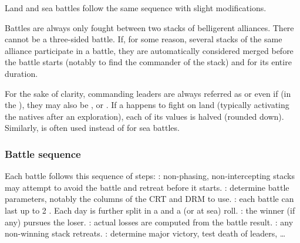 Land and sea battles follow the same sequence with slight modifications.

Battles are always only fought between two stacks of belligerent
alliances. There cannot be a three-sided battle. If, for some reason, several
stacks of the same alliance participate in a battle, they are automatically
considered merged before the battle starts (notably to find the commander of
the stack) and for its entire duration.


For the sake of clarity, commanding leaders are always referred as \LeaderG or
\LeaderA even if (in the \ROTW), they may also be \LeaderC, \LeaderGov or
\LeaderE. If a \LeaderE happens to fight on land (typically activating the
natives after an exploration), each of its values is halved (rounded
down). Similarly,  is often used instead of  for
sea battles.

\subsubsection{Battle sequence}
\aparag Each battle follows this sequence of steps:
\bparag {}: non-phasing, non-intercepting
stacks may attempt to avoid the battle and retreat before it starts.
\bparag {}: determine battle parameters,
notably the columns of the CRT and DRM to use.
\bparag {}: each battle can last up to 2
. Each day is further split in a  and a 
(or  at sea) roll.
\bparag {}: the winner (if any) pursues the
loser.
\bparag {}: actual losses are
computed from the battle result.
\bparag {}: any non-winning stack retreats.
\bparag {}: determine major victory, test
death of leaders, \ldots

